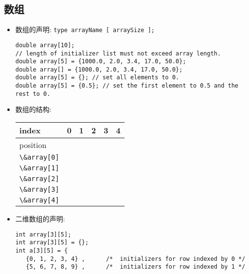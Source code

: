 \documentclass[a4paper,UTF8]{ctexart}
\begin{document}
\subsection{数组}

\begin{itemize}[leftmargin=0pt, rightmargin=0cm, labelwidth=0.8cm, labelsep=0.2cm]
\item 数组的声明: \lstinline{type arrayName [ arraySize ];} 
\begin{lstlisting}
double array[10];
// length of initializer list must not exceed array length.
double array[5] = {1000.0, 2.0, 3.4, 17.0, 50.0};
double array[] = {1000.0, 2.0, 3.4, 17.0, 50.0};
double array[5] = {}; // set all elements to 0.
double array[5] = {0.5}; // set the first element to 0.5 and the rest to 0.
\end{lstlisting}
\item 数组的结构:
  \vspace{-5pt}
  \begin{center}
  \begin{tabularx}{\textwidth}{| l | X | X | X | X | X |}
  \hline
   index & 0 & 1 & 2 & 3 & 4 \\ \hline
   position & \makecell[l]{\lstinline$array + 0$ \\ \lstinline$\&array[0]$} &
   \makecell[l]{\lstinline$array + 1$ \\ \lstinline$\&array[1]$} &
   \makecell[l]{\lstinline$array + 2$ \\ \lstinline$\&array[2]$} &
   \makecell[l]{\lstinline$array + 3$ \\ \lstinline$\&array[3]$} &
   \makecell[l]{\lstinline$array + 4$ \\ \lstinline$\&array[4]$} \\ \hline
  \end{tabularx}
  \end{center}
  \vspace{-5pt}
\item 二维数组的声明:
\begin{lstlisting}
int array[3][5];
int array[3][5] = {};
int a[3][5] = {  
   {0, 1, 2, 3, 4} ,      /*  initializers for row indexed by 0 */
   {5, 6, 7, 8, 9} ,      /*  initializers for row indexed by 1 */

\end{lstlisting}
\end{itemize}
\end{document}
